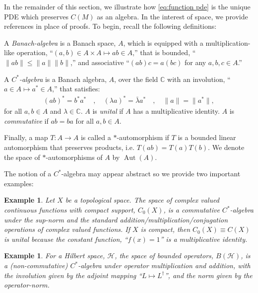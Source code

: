 \documentclass[final,leqno]{siamart}
\newtheorem{example}[theorem]{Example}
\begin{document}
In the remainder of this section, we illustrate how \eqref{eq:function pde} is the unique PDE which preserves $C(M)$ as an algebra.
In the interest of space, we provide references in place of proofs.
To begin, recall the following definitions:
\begin{definition} \label{def:algebra}
	A \emph{Banach-algebra} is a Banach space, $A$, which is equipped with a multiplication-like operation, ``$(a,b) \in A \times A \mapsto ab \in A$,''  that is bounded, ``$\| ab \| \leq \|a \| \|b \|$,'' and associative ``$(ab)c = a(bc)$ for any $a,b,c \in A$.''
	
	A \emph{$C^{*}$-algebra} is a Banach algebra, $A$, over the field $\mathbb{C}$ with an involution, ``$a \in A \mapsto a^{*} \in A$,'' that satisfies:
	\begin{align*}
		(ab)^{*} = b^{*} a^{*} \quad,\quad
		(\lambda a)^{*} = \bar{\lambda} a^{*} \quad,\quad
		\| a \| = \| a^{*}\|,
	\end{align*}
	for all $a,b \in A$ and $\lambda \in \mathbb{C}$.
	$A$ is \emph{unital} if $A$ has a multiplicative identity.
	$A$ is \emph{commutative} if $ab = ba$ for all $a,b \in A$.
	
	Finally, a map $T:A \to A$ is called a $*$-automorphism if $T$ is a bounded linear automorphism that preserves products, i.e. $T(ab) = T(a) T(b)$.
	We denote the space of $*$-automorphisms of $A$ by $\operatorname{Aut}(A)$.
\end{definition}

The notion of a $C^{*}$-algebra may appear abstract so we provide two important examples:
\begin{example} \label{ex:function algebra}
	Let $X$ be a topological space.
	The space of complex valued continuous functions with compact support, $C_{0}(X)$, is a commutative $C^{*}$-algebra under the sup-norm and the standard addition/multiplication/conjugation operations of complex valued functions.
	If $X$ is compact, then $C_{0}(X) \equiv C(X)$ is unital because the constant function, ``$f(x) = 1$'' is a multiplicative identity.
\end{example}

\begin{example} \label{ex:nc algebra} 
	For a Hilbert space, $\mathcal{H}$, the space of bounded operators, $B(\mathcal{H})$, is a (non-commutative) $C^{*}$-algebra	under operator multiplication and addition, with the involution given by the adjoint mapping ``$L \mapsto L^{\dagger}$'', and the norm given by the operator-norm.
\end{example}
\end{document}
